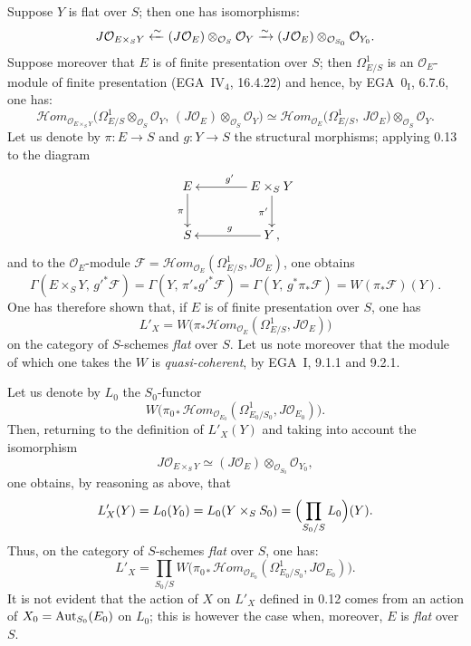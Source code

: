 Suppose \(Y\) is flat over \(S\); then one has isomorphisms:
\[
J\mathcal{O}_{E\times_{S}Y}
  \xleftarrow{\sim}
  (J\mathcal{O}_{E})\otimes_{\mathcal{O}_{S}}\mathcal{O}_{Y}
  \xrightarrow{\sim}
  (J\mathcal{O}_{E})\otimes_{\mathcal{O}_{S_{0}}}\mathcal{O}_{Y_{0}}.
\]
Suppose moreover that \(E\) is of finite presentation over \(S\); then
\(\Omega^{1}_{E/S}\) is an \(\mathcal{O}_{E}\)-module of finite presentation
(\cf EGA~\(\mathrm{IV}_{4}\), 16.4.22) and hence, by EGA~\(0_{\mathrm{I}}\),
6.7.6, one has:
\[
\mathcal{H}\mathit{om}_{\mathcal{O}_{E\times_{S}Y}}
  \bigl(
    \Omega^{1}_{E/S}\otimes_{\mathcal{O}_{S}}\mathcal{O}_{Y},\,
    (J\mathcal{O}_{E})\otimes_{\mathcal{O}_{S}}\mathcal{O}_{Y}
  \bigr)
\simeq
\mathcal{H}\mathit{om}_{\mathcal{O}_{E}}
  \bigl(\Omega^{1}_{E/S},\, J\mathcal{O}_{E}\bigr)
  \otimes_{\mathcal{O}_{S}}\mathcal{O}_{Y}.
\]
Let us denote by \(\pi\colon E\to S\) and \(g\colon Y\to S\) the structural
morphisms; applying 0.13 to the diagram
\[
\xymatrix@C=4em@R=2.4em{
E \ar[d]_{\pi}
  & E\times_{S}Y \ar[l]_{g'} \ar[d]_{\pi'}
  \\
S
  & Y \ar[l]_{g}
\,,}
\]
and to the \(\mathcal{O}_{E}\)-module
\(\mathcal{F}
  =\mathcal{H}\mathit{om}_{\mathcal{O}_{E}}(\Omega^{1}_{E/S}, J\mathcal{O}_{E})\),
one obtains
\[
\Gamma(E\times_{S}Y,\, g'^{*}\mathcal{F})
  =\Gamma(Y,\, \pi'_{*}g'^{*}\mathcal{F})
  =\Gamma(Y,\, g^{*}\pi_{*}\mathcal{F})
  =W(\pi_{*}\mathcal{F})(Y).
\]
One has therefore shown that, if \(E\) is of finite presentation over \(S\),
one has
\begin{equation}
L'_{X}
  =W\bigl(
    \pi_{*}\mathcal{H}\mathit{om}_{\mathcal{O}_{E}}
      (\Omega^{1}_{E/S}, J\mathcal{O}_{E})
  \bigr)
\tag{0.14.1}
\end{equation}
on the category of \(S\)-schemes \emph{flat} over \(S\). Let us note moreover
that the module of which one takes the \(W\) is \emph{quasi-coherent}, by
EGA~I, 9.1.1 and 9.2.1.

{\renewcommand{\thefootnote}{(31)}}%
Let us denote by \(L_{0}\) the \(S_{0}\)-functor
\[
W\bigl(
  \pi_{0*}\mathcal{H}\mathit{om}_{\mathcal{O}_{E_{0}}}
    (\Omega^{1}_{E_{0}/S_{0}}, J\mathcal{O}_{E_{0}})
\bigr).
\]
Then, returning to the definition of \(L'_{X}(Y)\) and taking into account
the isomorphism
\[
J\mathcal{O}_{E\times_{S}Y}
  \simeq
  (J\mathcal{O}_{E})\otimes_{\mathcal{O}_{S_{0}}}\mathcal{O}_{Y_{0}},
\]
one obtains, by reasoning as above, that
\[
L'_{X}(Y)
  =L_{0}(Y_{0})
  =L_{0}(Y\times_{S}S_{0})
  =\Bigl(\prod_{S_{0}/S}L_{0}\Bigr)(Y).
\]
Thus, on the category of \(S\)-schemes \emph{flat} over \(S\), one has:
\[
L'_{X}
  =\prod_{S_{0}/S}
  W\bigl(
    \pi_{0*}\mathcal{H}\mathit{om}_{\mathcal{O}_{E_{0}}}
      (\Omega^{1}_{E_{0}/S_{0}}, J\mathcal{O}_{E_{0}})
  \bigr).
\]
It is not evident that the action of \(X\) on \(L'_{X}\) defined in 0.12
comes from an action of \(X_{0}=\operatorname{Aut}_{S_{0}}(E_{0})\) on \(L_{0}\); this is
however the case when, moreover, \(E\) is \emph{flat} over \(S\).

